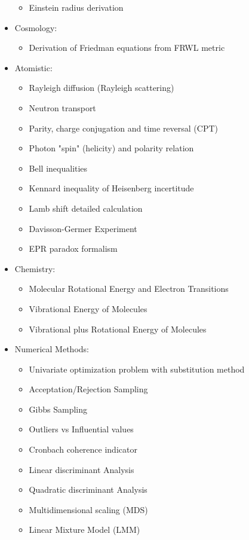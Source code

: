 \begin{itemize}
\begin{itemize}
				\item Einstein radius derivation			
			\end{itemize}
		\item Cosmology:
			\begin{itemize}
				\item Derivation of Friedman equations from FRWL metric
			\end{itemize}
		\item Atomistic:
			\begin{itemize}
				\item Rayleigh diffusion (Rayleigh scattering)
				\item Neutron transport
				\item Parity, charge conjugation and time reversal (CPT)
				\item Photon "spin" (helicity) and polarity relation
				\item Bell inequalities
				\item Kennard inequality of Heisenberg incertitude
				\item Lamb shift detailed calculation
				\item Davisson-Germer Experiment
				\item EPR paradox formalism
			\end{itemize}
		\item Chemistry:
			\begin{itemize}
				\item Molecular Rotational Energy and Electron Transitions	
				\item Vibrational Energy of Molecules
				\item Vibrational plus Rotational Energy of Molecules
			\end{itemize}
		\item Numerical Methods: 
			\begin{itemize}
				\item Univariate optimization problem with substitution method					
				\item Acceptation/Rejection Sampling
				\item Gibbs Sampling				
				\item Outliers vs Influential values
				\item Cronbach coherence indicator
				\item Linear discriminant Analysis
				\item Quadratic discriminant Analysis
				\item Multidimensional scaling (MDS)
				\item Linear Mixture Model (LMM)

\end{itemize}
\end{itemize}

